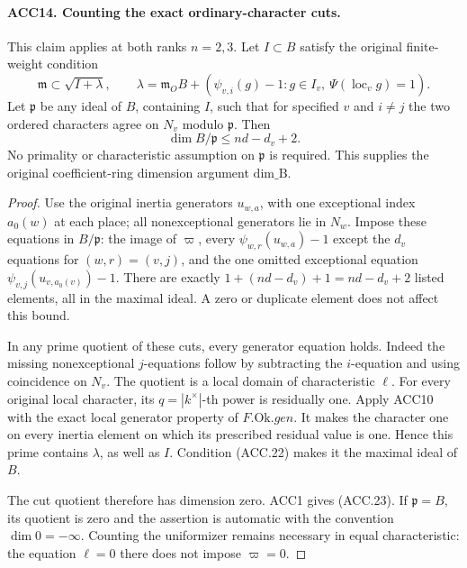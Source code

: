 \paragraph{ACC14. Counting the exact ordinary-character cuts.}
\label{claim:ACC14}
This claim applies at both ranks \(n=2,3\).  Let \(I\subset B\)
satisfy the original finite-weight condition
\[
 \mathfrak m\subset\sqrt{I+\lambda},\qquad
 \lambda=\mathfrak m_O B+
  (\psi_{v,i}(g)-1:g\in I_v,\ \Psi(\operatorname{loc}_v g)=1).
                                                               \tag{ACC.22}
\]
Let \(\mathfrak p\) be any ideal of \(B\), containing \(I\),
such that for specified \(v\) and \(i\ne j\) the two ordered
characters agree on \(N_v\) modulo \(\mathfrak p\).  Then
\[
                        \dim B/\mathfrak p\le nd-d_v+2.
                                                               \tag{ACC.23}
\]
No primality or characteristic assumption on \(\mathfrak p\)
is required.  This supplies the original coefficient-ring
dimension argument \(\mathrm{dim\_B}\).

\begin{proof}
Use the original inertia generators \(u_{w,a}\), with one exceptional
index \(a_0(w)\) at each place; all nonexceptional generators lie
in \(N_w\).  Impose these equations in \(B/\mathfrak p\):
the image of \(\varpi\), every
\(\psi_{w,r}(u_{w,a})-1\) except the \(d_v\) equations for
\((w,r)=(v,j)\), and the one omitted exceptional equation
\(\psi_{v,j}(u_{v,a_0(v)})-1\).  There are exactly
\(1+(nd-d_v)+1=nd-d_v+2\) listed elements, all in the maximal
ideal.  A zero or duplicate element does not affect this bound.

In any prime quotient of these cuts, every generator equation holds.
Indeed the missing nonexceptional \(j\)-equations follow by
subtracting the \(i\)-equation and using coincidence on \(N_v\).
The quotient is a local domain of characteristic \(\ell\).
For every original local character, its \(q=|k^\times|\)-th
power is residually one.  Apply ACC10 with the exact local generator
property of \(F.\mathrm{Ok}.gen\).  It makes the character one
on every inertia element on which its prescribed residual value is
one.  Hence this prime contains \(\lambda\), as well as \(I\).
Condition (ACC.22) makes it the maximal ideal of \(B\).

The cut quotient therefore has dimension zero.  ACC1 gives (ACC.23).
If \(\mathfrak p=B\), its quotient is zero and the assertion is
automatic with the convention \(\dim0=-\infty\).  Counting the
uniformizer remains necessary in equal characteristic: the equation
\(\ell=0\) there does not impose \(\varpi=0\).
\end{proof}

